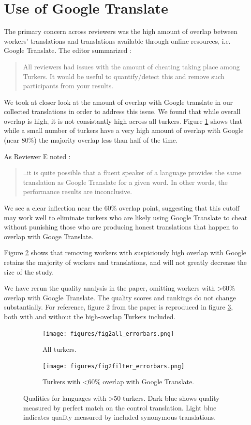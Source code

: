 \documentclass[11pt]{article}
\begin{document}
\section{Use of Google Translate}

The primary concern across reviewers was the high amount of overlap between workers' translations and translations available through online resources, i.e. Google Translate. The editor summarized : 
\begin{quote}
All reviewers had issues with the amount of cheating taking place among Turkers. It would be useful to quantify/detect this and remove such participants from your results.
\end{quote}

We took at closer look at the amount of overlap with Google translate in our collected translations in order to address this issue. We found that while overall overlap is high, it is not consistantly high across all turkers. Figure \ref{dist} shows that while a small number of turkers have a very high amount of overlap with Google (near 80\%) the majority overlap less than half of the time. 

As Reviewer E noted : 

\begin{quote}
..it is quite possible that a fluent speaker of a language provides the same translation as Google Translate for a given word.  In other words, the performance results are inconclusive.
\end{quote}

We see a clear inflection near the 60\% overlap point, suggesting that this cutoff may work well to eliminate turkers who are likely using Google Translate to cheat without punishing those who are producing honest translations that happen to overlap with Googe Translate.

Figure \ref{cdf} shows that removing workers with suspiciously high overlap with Google retains the majority of workers and translations, and will not greatly decrease the size of the study. 

We have rerun the quality analysis in the paper, omitting workers with \textgreater 60\% overlap with Google Translate. The quality scores and rankings do not change substantially. For reference, figure 2 from the paper is reproduced in figure \ref{qual}, both with and without the high-overlap Turkers included. 


\begin{figure}
\centering
\begin{subfigure}[b]{1\linewidth}
\texttt{[image: figures/fig2all\_errorbars.png]}
\caption{All turkers.}                
\label{dist}
\end{subfigure}
\begin{subfigure}[b]{1\linewidth}
\texttt{[image: figures/fig2filter\_errorbars.png]}
\caption{Turkers with \textless 60\% overlap with Google Translate.}
\label{cdf}
\end{subfigure}
\caption{Qualities for languages with \textgreater 50 turkers. Dark blue shows quality measured by perfect match on the control translation. Light blue indicates quality measured by included synonymous translations.}\label{qual}
\end{figure}
\end{document}
